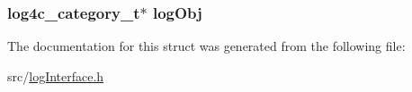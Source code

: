 \subsubsection[{\texorpdfstring{log\+Obj}{logObj}}]{\setlength{\rightskip}{0pt plus 5cm}log4c\+\_\+category\+\_\+t$\ast$ log\+Obj}\hypertarget{struct_logger_a58685359e8778fe049020259831b4dd2}{}\label{struct_logger_a58685359e8778fe049020259831b4dd2}


The documentation for this struct was generated from the following file\+:\begin{DoxyCompactItemize}
\item 
src/\hyperlink{log_interface_8h}{log\+Interface.\+h}\end{DoxyCompactItemize}
